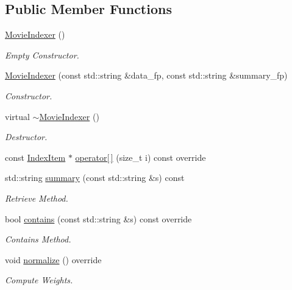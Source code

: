 \subsection*{Public Member Functions}
\begin{DoxyCompactItemize}
\item 
\hyperlink{class_movie_indexer_abbec3abae682cf2ef8605b5fae8916a6}{Movie\+Indexer} ()
\begin{DoxyCompactList}\small\item\em Empty Constructor. \end{DoxyCompactList}\item 
\hyperlink{class_movie_indexer_a9368e9bb63e2a854718521fa975102d2}{Movie\+Indexer} (const std\+::string \&data\+\_\+fp, const std\+::string \&summary\+\_\+fp)
\begin{DoxyCompactList}\small\item\em Constructor. \end{DoxyCompactList}\item 
virtual \hyperlink{class_movie_indexer_a9034e6e0568a3334ea42b23f9dc14dd4}{$\sim$\+Movie\+Indexer} ()
\begin{DoxyCompactList}\small\item\em Destructor. \end{DoxyCompactList}\item 
const \hyperlink{class_index_item}{Index\+Item} $\ast$ \hyperlink{class_movie_indexer_a088b5ec171f497ca107009f9c8486c2a}{operator\mbox{[}$\,$\mbox{]}} (size\+\_\+t i) const override
\item 
std\+::string \hyperlink{class_movie_indexer_a6723af1e2988be60cd24cad2014a7cad}{summary} (const std\+::string \&s) const
\begin{DoxyCompactList}\small\item\em Retrieve Method. \end{DoxyCompactList}\item 
bool \hyperlink{class_movie_indexer_a94c19bb7518b7d219cc88bab1a507030}{contains} (const std\+::string \&s) const override
\begin{DoxyCompactList}\small\item\em Contains Method. \end{DoxyCompactList}\item 
void \hyperlink{class_movie_indexer_a87d8a0a6c117e3cbc9f5872889b9ed6d}{normalize} () override
\begin{DoxyCompactList}\small\item\em Compute Weights. \end{DoxyCompactList}\item 

\end{DoxyCompactItemize}
